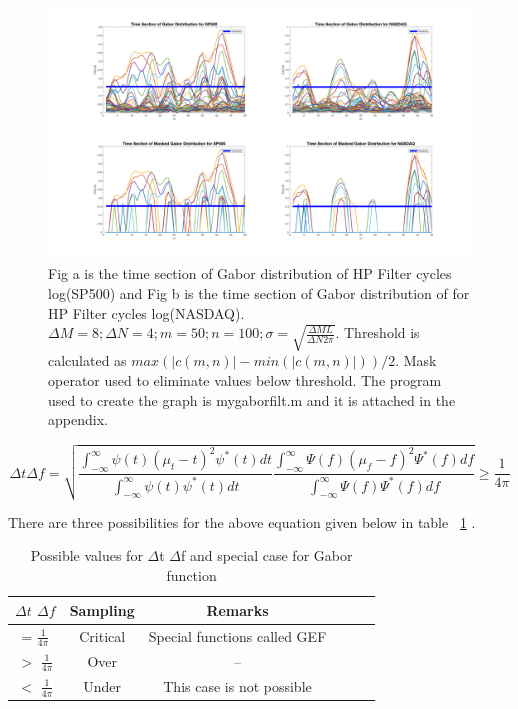 \begin{figure}[!ht]
\includegraphics[scale=.15]{Images/GaborPST50}
\caption{Fig a is the time section of Gabor distribution of HP Filter cycles log(SP500) and Fig b is the time section of Gabor distribution of for HP Filter cycles log(NASDAQ). $\Delta M = 8; \Delta N = 4; m = 50; n = 100; \sigma = \sqrt{\frac{\Delta M L}{\Delta N 2\pi}}$. Threshold is calculated as $max(|c(m,n)|-min(|c(m,n)|))/2$. Mask operator used to eliminate values below threshold. The program used to create the graph is mygaborfilt.m and it is attached in the appendix.}
\label{fig:GaborPST50}
\end{figure}



\begin{equation*}
\Delta t\Delta f = \sqrt{\frac{\int_{-\infty}^{\infty}{\psi(t)(\mu_t - t)^2\psi ^*(t)dt}}{\int_{-\infty}^{\infty}{\psi(t)\psi ^*(t)dt}} \frac{\int_{-\infty}^{\infty}{\Psi(f)(\mu_f - f)^2\Psi ^*(f)df}}{\int_{-\infty}^{\infty}{\Psi(f)\Psi ^*(f)df}}} \geq \frac{1}{4\pi}
\end{equation*}


There are three possibilities for the above equation given below in table ~\ref{table:sampling} .

\begin{table}[h!]
\centering
\begin{tabular}{|c|c|c|ccc|}
  \hline
  \textbf{$\Delta t$  $\Delta f$} & \textbf Sampling & Remarks \\
  \hline
  = $\frac{1}{4\pi}$ & Critical   & Special functions called GEF \\
  \hline
   $>$ $\frac{1}{4\pi}$ & Over   & -- \\
  \hline
  $<$ $\frac{1}{4\pi}$ & Under   & This case is not possible \\
  \hline
\end{tabular}
\caption{Possible values for $\Delta$t $\Delta$f and special case for Gabor function}
\label{table:sampling}
\end{table}


